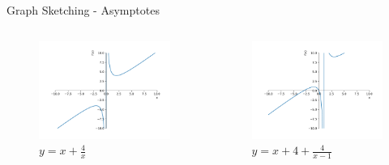 \documentclass[10pt]{beamer}
\begin{document}
\begin{frame}{Graph Sketching - Asymptotes}
  \begin{columns}
    \begin{column}{0.5\textwidth}
      \begin{center}
        \begin{figure}
          \includegraphics[width=\textwidth]{beamer-pics/asymptote-3.pdf}
          \caption*{$y = x + \frac{4}{x}$}
        \end{figure}
      \end{center}
    \end{column}

    \begin{column}{0.5\textwidth}
      \begin{center}
        \begin{figure}
          \includegraphics[width=\textwidth]{beamer-pics/asymptote-4.pdf}
          \caption*{$y = x + 4 + \frac{4}{x-1}$}
        \end{figure}
      \end{center}
    \end{column}
  \end{columns}
\end{frame}
\end{document}
